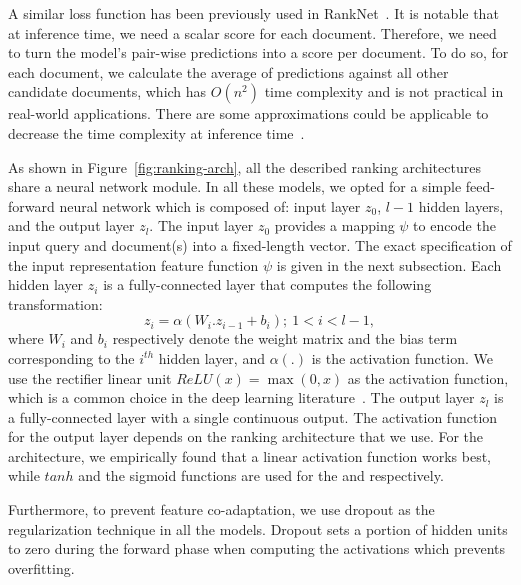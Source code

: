 A similar loss function has been previously used in RankNet~\citep{Burges:2005}. It is notable that at inference time, we need a scalar score for each document. Therefore, we need to turn the model's pair-wise predictions into a score per document. To do so, for each document, we calculate the average of predictions against all other candidate documents, which has $O(n^2)$ time complexity and is not practical in real-world applications. There are some approximations could be applicable to decrease the time complexity at inference time~\citep{Wauthier:2013}.

\medskip
As shown in Figure~\ref{fig:ranking-arch}, all the described ranking architectures share a neural network module. In all these models, we opted for a simple feed-forward neural network which is composed of: input layer $z_0$, $l-1$ hidden layers, and the output layer $z_l$. The input layer $z_0$ provides a mapping $\psi$ to encode the input query and document(s) into a fixed-length vector.
The exact specification of the input representation feature function $\psi$ is given in the next subsection. 
Each hidden layer $z_i$ is a fully-connected layer that computes the following transformation:
\begin{equation}
    z_i = \alpha(W_i.z_{i-1} + b_i); ~ 1<i<l-1,
\end{equation}
where $W_i$ and $b_i$ respectively denote the weight matrix and the bias term corresponding to the $i^{th}$ hidden layer, and $\alpha(.)$ is the activation function. We use the rectifier linear unit $\textit{ReLU}(x) = \max(0, x)$ as the activation function, which is a common choice in the deep learning literature~\citep{Lecun:2015}. 
The output layer $z_l$ is a fully-connected layer with a single continuous output. The activation function for the output layer depends on the ranking architecture that we use. For the \modelone architecture, we empirically found that a linear activation function works best, while $tanh$ and the sigmoid functions are used for the \modeltwo and \modelthree respectively.

Furthermore, to prevent feature co-adaptation, we use dropout as the regularization technique in all the models. Dropout sets a portion of hidden units to zero during the forward phase when computing the activations which prevents overfitting.


